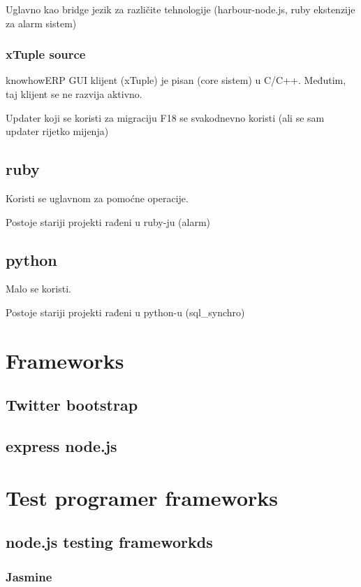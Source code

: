 \documentclass[times, utf8, seminar]{fit}
\begin{document}
Uglavno kao bridge jezik za različite tehnologije (harbour-node.js, ruby ekstenzije za alarm sistem)

\subsection{xTuple source}

knowhowERP GUI klijent (xTuple) je pisan (core sistem) u C/C++. Međutim, taj klijent se ne razvija aktivno.

Updater koji se koristi za migraciju F18 se svakodnevno koristi (ali se sam updater rijetko mijenja)

\section{ruby}

Koristi se uglavnom za pomoćne operacije. 

Postoje stariji projekti rađeni u ruby-ju (alarm)

\section{python}

Malo se koristi. 

Postoje stariji projekti rađeni u python-u (sql\_synchro)

\chapter{Frameworks}

\section{Twitter bootstrap}

\section{express node.js}

\chapter{Test programer frameworks}

\section{node.js testing frameworkds}

\subsection{Jasmine}
\end{document}
